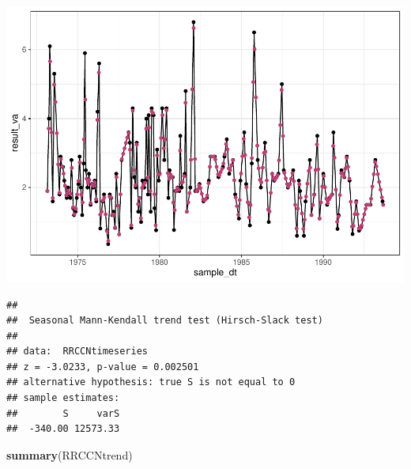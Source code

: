 \documentclass[12pt,]{article}
\newenvironment{Shaded}{\begin{snugshade}}{\end{snugshade}}
\newcommand{\CommentTok}[1]{\textcolor[rgb]{0.56,0.35,0.01}{\textit{#1}}}
\newcommand{\DataTypeTok}[1]{\textcolor[rgb]{0.13,0.29,0.53}{#1}}
\newcommand{\DecValTok}[1]{\textcolor[rgb]{0.00,0.00,0.81}{#1}}
\newcommand{\KeywordTok}[1]{\textcolor[rgb]{0.13,0.29,0.53}{\textbf{#1}}}
\newcommand{\NormalTok}[1]{#1}
\newcommand{\OperatorTok}[1]{\textcolor[rgb]{0.81,0.36,0.00}{\textbf{#1}}}
\newcommand{\StringTok}[1]{\textcolor[rgb]{0.31,0.60,0.02}{#1}}
\begin{document}
\includegraphics{Project_Template_files/figure-latex/unnamed-chunk-6-26.pdf}

\begin{Shaded}
\end{Shaded}

\begin{verbatim}
## 
##  Seasonal Mann-Kendall trend test (Hirsch-Slack test)
## 
## data:  RRCCNtimeseries
## z = -3.0233, p-value = 0.002501
## alternative hypothesis: true S is not equal to 0
## sample estimates:
##        S     varS 
##  -340.00 12573.33
\end{verbatim}

\begin{Shaded}
\begin{Highlighting}[]
\KeywordTok{summary}\NormalTok{(RRCCNtrend)}
\end{Highlighting}
\end{Shaded}
\end{document}
